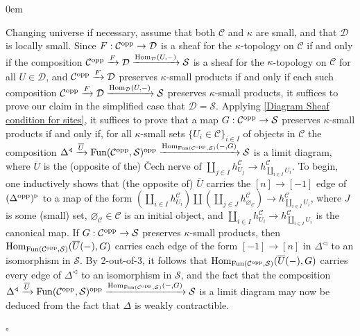 \documentclass[10pt]{article}
\newcommand{\mS}{\mathcal S}
\newcommand{\C}{\mathcal C}
\newcommand{\cD}{\mathcal{D}}
\renewcommand{\qed}{\hfill$\square$}
\renewenvironment{proof}{\begin{addmargin}[1em]{0em}\begin{newproof}}{\end{newproof}\end{addmargin}\qed}
\theoremstyle{witharg}
\theoremstyle{witharg}
\theoremstyle{witharg2}
\begin{document}
\begin{proof} Changing universe if necessary, assume that both $\C$ and $\kappa$ are small, and that $\cD$ is locally small. Since $F:\C^{\textnormal{opp}}\rightarrow \cD$ is a sheaf for the $\kappa$-topology on $\C$ if and only if the composition $\C^{\textnormal{opp}}\xrightarrow{F} \cD\xrightarrow{\textnormal{Hom}_\cD(U,-)}\mS$ is a sheaf for the $\kappa$-topology on $\C$ for all $U\in \cD$, and $\C^{\textnormal{opp}}\xrightarrow{F} \cD$ preserves $\kappa$-small products if and only if each such composition $\C^{\textnormal{opp}}\xrightarrow{F} \cD\xrightarrow{\textnormal{Hom}_\cD(U,-)}\mS$ preserves $\kappa$-small products, it suffices to prove our claim in the simplified case that $\cD=\mS$. Applying \ref{Diagram Sheaf condition for sites}, it suffices to prove that a map $G:\C^{\textnormal{opp}}\rightarrow \mS$ preserves $\kappa$-small products if and only if, for all $\kappa$-small sets $\{U_i\in \C\}_{i\in I}$ of objects in $\C$ the composition $\Delta^\triangleleft\xrightarrow{\overline{U}}\textnormal{Fun}(\C^{\textnormal{opp}},\mS)^{\textnormal{opp}}\xrightarrow{\textnormal{Hom}_{\textnormal{Fun}(\C^{\textnormal{opp}},\mS)}(-,G)}\mS$ is a limit diagram, where $\overline{U}$ is the (opposite of the) \v{C}ech nerve of $\coprod_{j\in I}h^\C_{U_j}\rightarrow h^\C_{\coprod_{i\in I}U_i}$. To begin, one inductively shows that (the opposite of) $\overline{U}$ carries the $[n]\rightarrow [-1]$ edge of $(\Delta^{\textnormal{opp}})^\triangleright$ to a map of the form $(\coprod_{i\in I}h^\C_{U_i})\coprod (\coprod_{j\in J}h^\C_{\varnothing_\C})\rightarrow h^\C_{\coprod_{i\in I}{U_i}}$, where $J$ is some (small) set, $\varnothing_\C\in \C$ is an initial object, and $\coprod_{i\in I}h^\C_{U_i}\rightarrow h^\C_{\coprod_{i\in I}{U_i}}$ is the canonical map. If $G:\C^{\textnormal{opp}}\rightarrow \mS$ preserves $\kappa$-small products, then $\textnormal{Hom}_{\textnormal{Fun}(\C^{\textnormal{opp}},\mS)}(\overline{U}(-),G)$ carries each edge of the form $[-1]\rightarrow [n]$ in $\Delta^\triangleleft$ to an isomorphism in $\mS$. By 2-out-of-3, it follows that $\textnormal{Hom}_{\textnormal{Fun}(\C^{\textnormal{opp}},\mS)}(\overline{U}(-),G)$ carries every edge of $\Delta^\triangleleft$ to an isomorphism in $\mS$, and the fact that the composition $\Delta^\triangleleft\xrightarrow{\overline{U}}\textnormal{Fun}(\C^{\textnormal{opp}},\mS)^{\textnormal{opp}}\xrightarrow{\textnormal{Hom}_{\textnormal{Fun}(\C^{\textnormal{opp}},\mS)}(-,G)}\mS$ is a limit diagram may now be deduced from the fact that $\Delta$ is weakly contractible.  


\end{proof}
\end{document}
